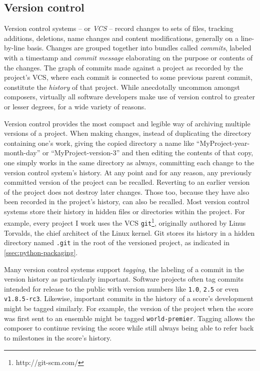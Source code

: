 \subsection{Version control}
\label{ssec:version-control}


Version control systems\cite{loeliger2009git} -- or \emph{VCS} -- record
changes to sets of files, tracking additions, deletions, name changes and
content modifications, generally on a line-by-line basis. Changes are grouped
together into bundles called \emph{commits}, labeled with a timestamp and
\emph{commit message} elaborating on the purpose or contents of the changes.
The graph of commits made against a project as recorded by the project's VCS,
where each commit is connected to some previous parent commit, constitute the
\emph{history} of that project. While anecdotally uncommon amongst composers,
virtually all software developers make use of version control to greater or
lesser degrees, for a wide variety of reasons.

Version control provides the most compact and legible way of archiving multiple
versions of a project. When making changes, instead of duplicating the
directory containing one's work, giving the copied directory a name like
\enquote{MyProject-year-month-day} or \enquote{MyProject-version-3} and then
editing the contents of that copy, one simply works in the same directory as
always, committing each change to the version control system's history. At any
point and for any reason, any previously committed version of the project can
be recalled. Reverting to an earlier version of the project does not destroy
later changes. Those too, because they have also been recorded in the project's
history, can also be recalled. Most version control systems store their history
in hidden files or directories within the project. For example, every project I
work uses the VCS \texttt{git}\footnote{http://git-scm.com/}, originally
authored by Linus Torvalds, the chief architect of the Linux kernel. Git stores
its history in a hidden directory named \texttt{.git} in the root of the
versioned project, as indicated in \autoref{ssec:python-packaging}.

Many version control systems support \emph{tagging}, the labeling of a commit
in the version history as particularly important. Software projects often tag
commits intended for release to the public with version numbers like
\texttt{1.0}, \texttt{2.5} or even \texttt{v1.8.5-rc3}. Likewise, important
commits in the history of a score's development might be tagged similarly. For
example, the version of the project when the score was first sent to an
ensemble might be tagged \texttt{world-premier}. Tagging allows the composer to
continue revising the score while still always being able to refer back to
milestones in the score's history.

